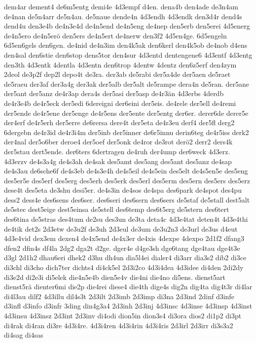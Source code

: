 {dem4ar
dement4
de6m5entg
demi4e
4d3empf
d4en.
dena4b
den4ade
de3n4am
de4nan
de5n4arr
de5n4au.
de5naue
dende4n
4d3endh
4d3endk
den3d4r
dend4s
dend4u
den3e4b
de4n3e4d
de4n5end
de4n5eng
de4nep
den5erb
den5erei
4d5energ
de4n5ero
de4n5erö
den5ers
de4n5ert
de4nerw
den3f2
4d5en4ge.
6d5engeln
6d5en6gels
den6gen.
de4nid
de4n3im
den4k5ak
den6kerl
den4k5ob
de4nob
d4ens
den4sal
den6stie
den6stop
dens5tor
den4sur
4d3entd
dentengene6
4d3entf
4d3entg
den3th
4d3entk
4dentla
4d3entn
den6trop
4dentw
4dentz
den6z5erf
den4zym
2deol
de3p2f
dep2l
depo4t
de3ra.
der3ab
de5rabi
der5a4de
der5aen
de5raet
de5raeu
der3af
der3a4g
der3ak
der5alb
der5alt
de5rampe
dera4n
de5ran.
der5ane
der5ant
der5anz
de4r3ap
dera4s
der5asi
der5asp
de4r3än
4d3erbs
4derdb
de4r3e4b
de4r5eck
der5edi
6dereigni
der6eini
der5eis.
de4rele
der5ell
de4remi
der5ende
de4r5ene
der5enge
de4r5ens
der5ente
der5entg
der6er.
derer6de
derer5e
der4erf
de4r5erh
der5erre
de6rersa
dere4t
der5eta
de4r3eu
derf4
der5fl
derg2
6dergebn
de4r3id
de4r3i4m
der5inb
der5inner
de6r5innu
derin6teg
de4r5iss
derk2
der4nal
der5o6ber
deroe4
der5oef
der5onk
de4ror
de3rot
derö2
derr2
ders4k
der5stau
dert5ende.
der6ters
6dertragen
de4ruh
der4ump
der6weck
4d3erz.
4d3erzv
de4s3a4g
de4s3ah
de4sak
des5amt
des5ang
des5ant
des5anz
de4sap
de4s3au
de6sche6f
de4s3eb
de4s3e4h
de4s5eil
de4s5ein
des5elt
de4s5en5e
des5eng
des5er5e
des5erf
des5erg
des5erh
des5erk
des5erl
des5erm
des5ern
des5ers
des5erz
dese4t
des5eta
de3shu
desi5er.
de4s3in
de4sos
de4spa
des6park
de4spot
des4pu
dess2
dess4e
des6sens
des6ser.
des6seri
des6sern
des6sers
de5staf
de5stall
dest5alt
de5stec
dest5eige
dest5einsa
de5stell
des6temp
des6t5erg
de5stern
des6tert
des6tina
de5stras
des4tum
de2su
des3un
de3ta
deta4c
4d3e4tat
deten4t
4d3e4thi
de4tik
det2s
2d3etw
de3u2f
de3uh
2d3eul
de3um
de3u2n3
de3url
de3us
d4eut
4d3e4vid
dex3em
dexen4
de4x5end
de4x3er
de4xis
4dexpe
4dexpo
2d1f2
dfang3
dfen2
dfin4s
df4la
2dg2
dga2t
d2ge.
dger4e
d4ge3sh
dge6tang
dge4tau
dge4t3e
d3gl
2d1h2
dhau6eri
dhek2
d3hu
dh4un
dia5l4ei
dialer4
di3arr
dia3s2
dib2
di3ce
di3chl
di3cho
dich7ter
dichts4
di4ck5el
2d3i2co
4d3i4dea
4d3idee
di4den
2di2dy
di3e2d
di2e3i
di5elek
die4n5e4b
dien5e4v
die4ni
die4no
di5ens.
dienst5art
dienst5rä
dienter6mi
die2p
die4rei
diese4
die4th
dige4s
dig2n
dig4ta
dig4t3r
di4lar
di4l3au
dilf2
4d3illu
dil4s3t
2d3ilt
2d3imb
2d3imp
di3na
2d3ind
2dinf
d3infe
d3infl
d3info
d3infr
3ding
din4g3a4
2d3inh
2d3inj
4d3insc
4d3inse
4d3insp
4d3inst
4d3insu
4d3insz
2d3int
2d3inv
di4odi
dion5in
dion3s4
di3ora
dios2
di1p2
di3pt
di4rak
di4ran
di3re
4d3i4re.
4d3i4ren
4d3i4rin
4d3i4ris
2d3irl
2d3irr
di3s3a2
di4sag
di4sas
}
